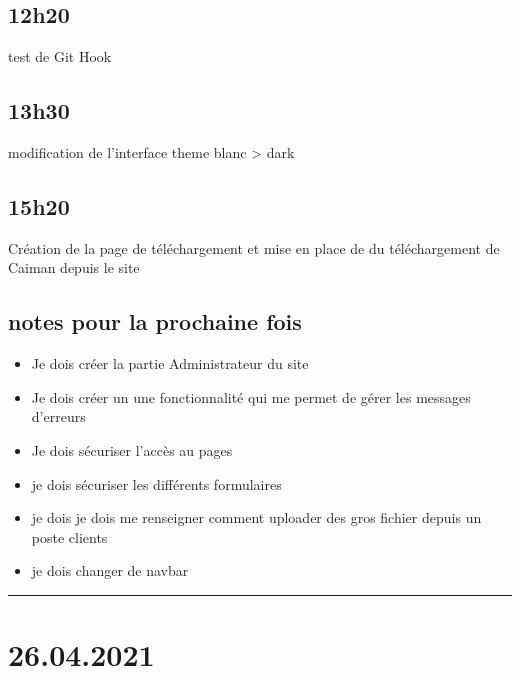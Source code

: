 \documentclass[a4paper,12pt,french]{sphinxmanual}
\begin{document}
\subsection{12h20}
\label{\detokenize{logbook:id23}}
\sphinxAtStartPar
test de Git Hook


\subsection{13h30}
\label{\detokenize{logbook:id24}}
\sphinxAtStartPar
modification de l’interface theme blanc \sphinxhyphen{}> dark


\subsection{15h20}
\label{\detokenize{logbook:id25}}
\sphinxAtStartPar
Création de la page de téléchargement et mise en place de du téléchargement de Caiman depuis le site


\subsection{notes pour la prochaine fois}
\label{\detokenize{logbook:notes-pour-la-prochaine-fois}}\begin{itemize}
\item {} 
\sphinxAtStartPar
Je dois créer la partie Administrateur du site

\item {} 
\sphinxAtStartPar
Je dois créer un une fonctionnalité qui me permet de gérer les messages d’erreurs

\item {} 
\sphinxAtStartPar
Je dois sécuriser l’accès au pages

\item {} 
\sphinxAtStartPar
je dois sécuriser les différents formulaires

\item {} 
\sphinxAtStartPar
je dois je dois me renseigner comment uploader des gros fichier depuis un poste clients

\item {} 
\sphinxAtStartPar
je dois changer de navbar

\end{itemize}


\bigskip\hrule\bigskip



\section{26.04.2021}
\label{\detokenize{logbook:id26}}
\end{document}
